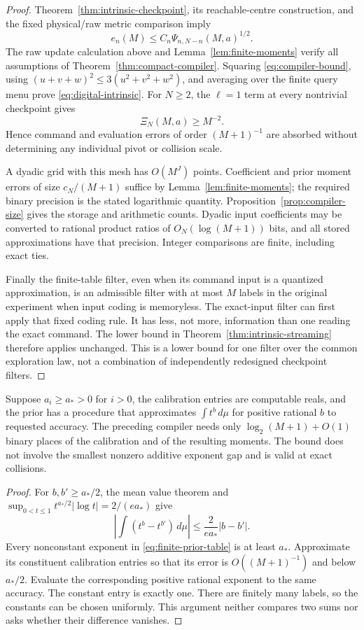 \begin{proof}
Theorem~\ref{thm:intrinsic-checkpoint}, its reachable-centre construction,
and the fixed physical/raw metric comparison imply
\[
 e_n(M)\le C_n\Psi_{n,N-n}(M,a)^{1/2}.
\]
The raw update calculation above and Lemma~\ref{lem:finite-moments}
verify all assumptions of Theorem~\ref{thm:compact-compiler}. Squaring
\eqref{eq:compiler-bound}, using
$(u+v+w)^2\le3(u^2+v^2+w^2)$, and averaging over the finite query
menu prove \eqref{eq:digital-intrinsic}. For $N\ge2$, the $\ell=1$
term at every nontrivial checkpoint gives
\[
 \Xi_N(M,a)\ge M^{-2}.
\]
Hence command and evaluation errors of order $(M+1)^{-1}$ are absorbed
without determining any individual pivot or collision scale.

A dyadic grid with this mesh has $O(M^J)$ points. Coefficient and prior
moment errors of size $c_N/(M+1)$ suffice by
Lemma~\ref{lem:finite-moments}; the required binary precision is the
stated logarithmic quantity. Proposition~\ref{prop:compiler-size} gives
the storage and arithmetic counts. Dyadic input coefficients may be
converted to rational product ratios of $O_N(\log(M+1))$ bits, and all
stored approximations have that precision. Integer comparisons are
finite, including exact ties.

Finally the finite-table filter, even when its command input is a
quantized approximation, is an admissible filter with at most $M$
labels in the original experiment when input coding is memoryless.
The exact-input filter can first apply that fixed coding rule. It has less, not more, information
than one reading the exact command. The lower bound in
Theorem~\ref{thm:intrinsic-streaming} therefore applies unchanged.
This is a lower bound for one filter over the common exploration law,
not a combination of independently redesigned checkpoint filters.
\end{proof}

\begin{corollary}
\label{cor:calibration-precision}
Suppose $a_i\ge a_*>0$ for $i>0$, the calibration entries are
computable reals, and the prior has a procedure that approximates
$\int t^b\,d\mu$ for positive rational $b$ to requested accuracy.
The preceding compiler needs only $\log_2(M+1)+O(1)$ binary places
of the calibration and of the resulting moments. The bound does not
involve the smallest nonzero additive exponent gap and is valid at
exact collisions.
\end{corollary}
\begin{proof}
For $b,b'\ge a_*/2$, the mean value theorem and
$\sup_{0<t\le1}t^{a_*/2}|\log t|=2/(e a_*)$ give
\[
 \left|\int(t^b-t^{b'})\,d\mu\right|
                   \le\frac{2}{e a_*}|b-b'|.
\]
Every nonconstant exponent in \eqref{eq:finite-prior-table} is at least
$a_*$. Approximate its constituent calibration entries so that its
error is $O((M+1)^{-1})$ and below $a_*/2$. Evaluate the corresponding
positive rational exponent to the same accuracy. The constant entry
is exactly one. There are finitely many labels, so the constants can
be chosen uniformly. This argument neither compares two sums nor asks
whether their difference vanishes.
\end{proof}

